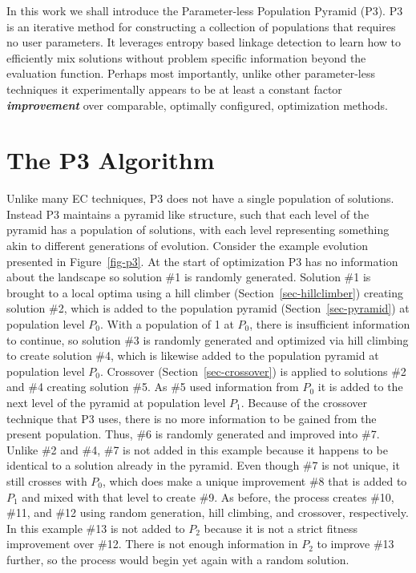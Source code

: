 \documentclass{sig-alternate}
\begin{document}
In this work we shall introduce the Parameter-less Population Pyramid
(P3).  P3 is an iterative method for constructing a collection of
populations that requires no user parameters.  It leverages entropy based
linkage detection to learn how to efficiently mix solutions without
problem specific information beyond the evaluation function.  Perhaps
most importantly, unlike other parameter-less techniques it
experimentally appears to be at least a constant factor
\emph{\textbf{improvement}} over comparable, optimally configured,
optimization methods.

\section{The P3 Algorithm}
\label{sec-p3}
Unlike many EC techniques, P3
does not have a single population of solutions.  Instead P3 maintains
a pyramid like structure, such that each level of the pyramid has a
population of solutions, with each level representing something akin
to different generations of evolution. Consider the example evolution
presented in Figure~\ref{fig-p3}.  At the start of optimization P3
has no information about the landscape so solution \#1 is randomly generated.  Solution \#1
is brought to a local optima using a hill climber
(Section~\ref{sec-hillclimber}) creating solution \#2, which is added
to the population pyramid (Section~\ref{sec-pyramid}) at population
level $P_0$.  With a population of 1 at $P_0$, there is insufficient information to continue,
so solution \#3 is randomly generated and optimized via hill climbing
to create solution \#4, which is likewise added to the population
pyramid at population level $P_0$.
Crossover (Section~\ref{sec-crossover}) is applied to solutions \#2
and \#4 creating solution \#5. As \#5 used
information from $P_0$ it is added to the next level of the pyramid at
population level $P_1$.  Because of the crossover technique that P3
uses, there is no more information to be gained from the present
population. Thus, \#6 is randomly
generated and improved into \#7.  Unlike \#2 and \#4, \#7 is not added
in this example because it happens to be identical to a solution
already in the pyramid.  Even though \#7 is not unique, it still
crosses with $P_0$, which does make a unique improvement \#8 that is
added to $P_1$ and mixed with that level to create \#9.  As before,
the process creates \#10, \#11, and \#12 using random generation, hill
climbing, and crossover, respectively.  In this example \#13 is not
added to $P_2$ because it is not a strict fitness improvement over
\#12.  There is not enough information in $P_2$ to improve \#13
further, so the process would begin yet again with a random solution.
\end{document}
